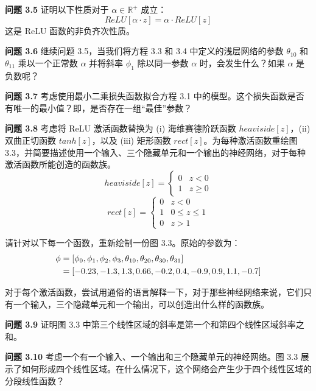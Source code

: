 \documentclass[lang=cn,newtx,10pt,scheme=chinese]{elegantbook}
\begin{document}
\textbf{问题 3.5} 证明以下性质对于 \(\alpha \in \mathbb{R}^+\) 成立：
\begin{equation}
ReLU[\alpha \cdot z] = \alpha \cdot ReLU[z] 
\end{equation}
这是 ReLU 函数的非负齐次性质。

\textbf{问题 3.6} 继续问题 3.5，当我们将方程 3.3 和 3.4 中定义的浅层网络的参数 \(\theta_{10}\) 和 \(\theta_{11}\) 乘以一个正常数 \(\alpha\) 并将斜率 \(\phi_1\) 除以同一参数 \(\alpha\) 时，会发生什么？如果 \(\alpha\) 是负数呢？

\textbf{问题 3.7} 考虑使用最小二乘损失函数拟合方程 3.1 中的模型。这个损失函数是否有唯一的最小值？即，是否存在一组“最佳”参数？

\textbf{问题 3.8} 考虑将 ReLU 激活函数替换为 (i) 海维赛德阶跃函数 \(heaviside[z]\)，(ii) 双曲正切函数 \(tanh[z]\)，以及 (iii) 矩形函数 \(rect[z]\)。为每种激活函数重绘图 3.3，并简要描述使用一个输入、三个隐藏单元和一个输出的神经网络，对于每种激活函数所能创造的函数族。
\begin{equation}
heaviside[z] = \begin{cases}
	0 & z < 0 \\
	1 & z \geq 0
\end{cases}
\end{equation}
\begin{equation}
rect[z] = \begin{cases}
	0 & z < 0 \\
	1 & 0 \leq z \leq 1 \\
	0 & z > 1
\end{cases} 
\end{equation}

请针对以下每一个函数，重新绘制一份图 3.3。原始的参数为：
\begin{align}
	\phi &= [\phi_0, \phi_1, \phi_2, \phi_3, \theta_{10}, \theta_{20}, 	\theta_{30}, 	\theta_{31}] \notag \\
	&= [-0.23, -1.3, 1.3, 0.66, -0.2, 0.4, -0.9, 0.9, 1.1, -0.7]
\end{align}

对于每个激活函数，尝试用通俗的语言解释一下，对于那些神经网络来说，它们只有一个输入，三个隐藏单元和一个输出，可以创造出什么样的函数族。


\textbf{问题 3.9} 证明图 3.3 中第三个线性区域的斜率是第一个和第四个线性区域斜率之和。

\textbf{问题 3.10} 考虑一个有一个输入、一个输出和三个隐藏单元的神经网络。图 3.3 展示了如何形成四个线性区域。在什么情况下，这个网络会产生少于四个线性区域的分段线性函数？
\end{document}
